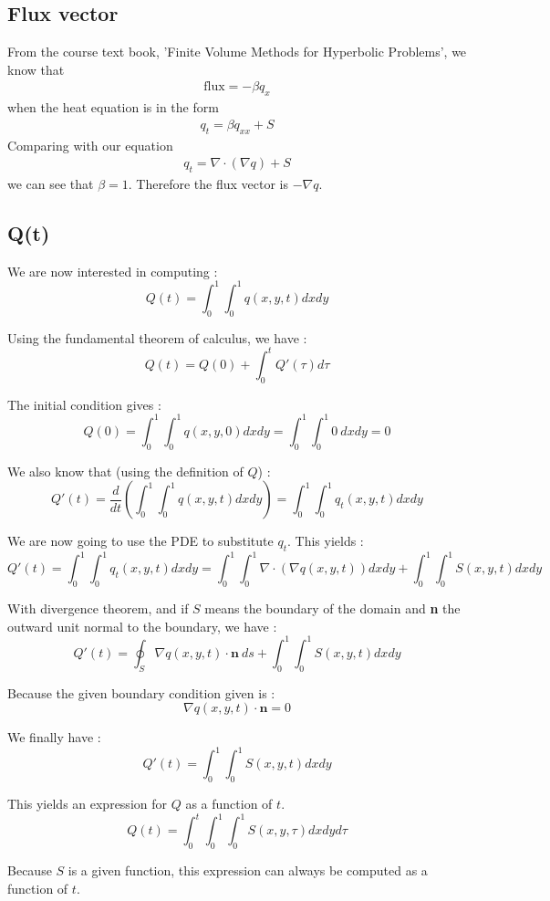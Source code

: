 \subsection{Flux vector}

From the course text book, 'Finite Volume Methods for Hyperbolic Problems', we know that 
\begin{align*}
\text{flux} = - \beta q_x
\end{align*}
when the heat equation is in the form
\begin{align*}
q_t = \beta q_{xx} + S
\end{align*}
Comparing with our equation
\begin{align*}
q_t = \nabla \cdot (\nabla q) + S
\end{align*}
we can see that $\beta = 1$. Therefore the flux vector is $-\nabla q$.
\subsection{Q(t)}

We are now interested in computing : 
$$Q(t) = \int_0^1\int_0^1 q(x,y,t)dxdy$$

Using the fundamental theorem of calculus, we have :
$$Q(t) = Q(0) + \int_0^t Q'(\tau)d\tau$$

The initial condition gives :
$$Q(0) =\int_0^1\int_0^1 q(x,y,0)dxdy = \int_0^1\int_0^1 0 \: dxdy = 0$$

We also know that (using the definition of $Q$) :
$$Q'(t) = \frac{d}{dt}(\int_0^1\int_0^1 q(x,y,t)dxdy)=\int_0^1\int_0^1 q_t(x,y,t)dxdy$$

We are now going to use the PDE to substitute $q_t$. This yields :
$$Q'(t) = \int_0^1\int_0^1 q_t(x,y,t)dxdy = \int_0^1\int_0^1 \nabla \cdot (\nabla q(x,y,t))dxdy+\int_0^1\int_0^1 S(x,y,t) dxdy$$

With divergence theorem, and if $S$ means the boundary of the domain and \textbf{n} the outward unit normal to the boundary, we have : 
$$Q'(t) = \oint_S \nabla q(x,y,t)\cdot \textbf{n} \: ds + \int_0^1\int_0^1 S(x,y,t)dxdy$$

Because the given boundary condition given is :
$$\nabla q(x,y,t)\cdot \textbf{n} = 0$$

We finally have : 
$$Q'(t) = \int_0^1\int_0^1 S(x,y,t)dxdy$$

This yields an expression for $Q$ as a function of $t$.
$$Q(t) = \int_0^t\int_0^1\int_0^1 S(x,y,\tau)dxdyd\tau$$

Because $S$ is a given function, this expression can always be computed as a function of $t$.
